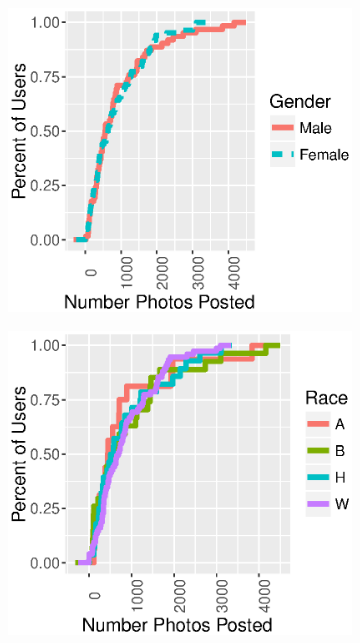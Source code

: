 \begin{figure}[t]
  \centering
  \begin{subfigure}[b]{.21\textwidth}
    \centering
    \includegraphics[width=\linewidth]{fig/census/numphoto_cdf_gender.eps}
    \caption{}
    \label{fig:numphoto_cdf_gender}
  \end{subfigure}
  \begin{subfigure}[b]{.21\textwidth}
    \centering
    \includegraphics[width=\linewidth]{fig/census/numphoto_cdf_race.eps}
    \caption{}
    \label{fig:numphoto_cdf_race}
  \end{subfigure}
  \caption{}
  \label{fig:numphoto_cdf}
\end{figure}


